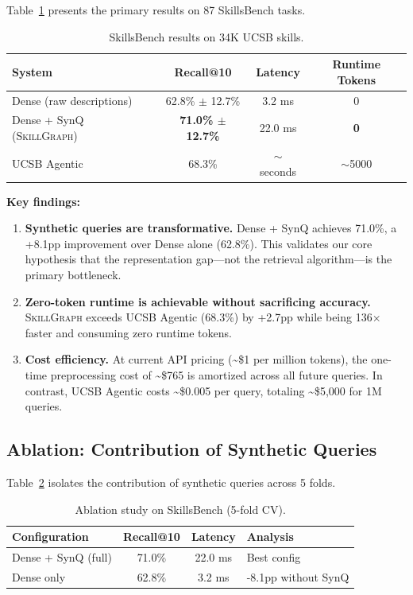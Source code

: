 \documentclass[11pt,a4paper]{article}
\newcommand{\ours}{\textsc{SkillGraph}}
\newcommand{\ucsb}{\textsc{UCSB}}
\begin{document}
Table~\ref{tab:main-results} presents the primary results on 87 SkillsBench tasks.

\begin{table}[h]
\centering
\small
\caption{SkillsBench results on 34K UCSB skills.}
\label{tab:main-results}
\begin{tabular}{@{}lccc@{}}
\toprule
\textbf{System} & \textbf{Recall@10} & \textbf{Latency} & \textbf{Runtime Tokens} \\
\midrule
Dense (raw descriptions) & 62.8\% $\pm$ 12.7\% & 3.2 ms & 0 \\
Dense + SynQ (\ours{}) & \textbf{71.0\% $\pm$ 12.7\%} & 22.0 ms & \textbf{0} \\
\midrule
\ucsb{} Agentic \citep{ucsb2026} & 68.3\% & $\sim$seconds & $\sim$5000 \\
\bottomrule
\end{tabular}
\end{table}

\textbf{Key findings:}

\begin{enumerate}
  \item \textbf{Synthetic queries are transformative.} Dense + SynQ achieves 71.0\%, a +8.1pp improvement over Dense alone (62.8\%). This validates our core hypothesis that the representation gap---not the retrieval algorithm---is the primary bottleneck.

  \item \textbf{Zero-token runtime is achievable without sacrificing accuracy.} \ours{} exceeds \ucsb{} Agentic (68.3\%) by +2.7pp while being 136$\times$ faster and consuming zero runtime tokens.

  \item \textbf{Cost efficiency.} At current API pricing (\textasciitilde\$1 per million tokens), the one-time preprocessing cost of \textasciitilde\$765 is amortized across all future queries. In contrast, \ucsb{} Agentic costs \textasciitilde\$0.005 per query, totaling \textasciitilde\$5,000 for 1M queries.
\end{enumerate}

\subsection{Ablation: Contribution of Synthetic Queries}

Table~\ref{tab:ablation} isolates the contribution of synthetic queries across 5 folds.

\begin{table}[h]
\centering
\small
\caption{Ablation study on SkillsBench (5-fold CV).}
\label{tab:ablation}
\begin{tabular}{@{}lccl@{}}
\toprule
\textbf{Configuration} & \textbf{Recall@10} & \textbf{Latency} & \textbf{Analysis} \\
\midrule
Dense + SynQ (full) & 71.0\% & 22.0 ms & Best config \\
Dense only & 62.8\% & 3.2 ms & -8.1pp without SynQ \\
\bottomrule
\end{tabular}
\end{table}
\end{document}
